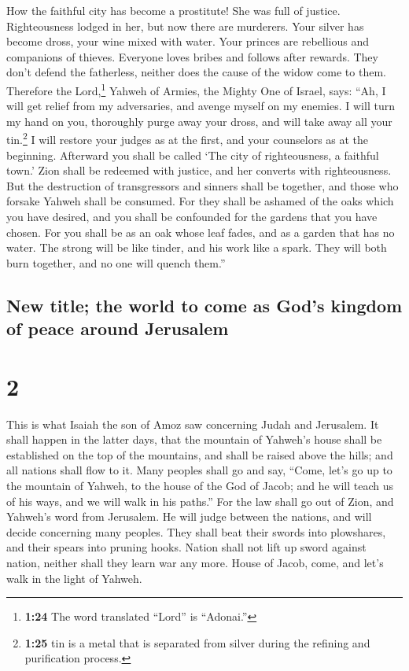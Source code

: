  How the faithful city has become a prostitute! She was
full of justice. Righteousness lodged in her, but now there are
murderers.  Your silver has become dross, your wine mixed
with water.  Your princes are rebellious and companions
of thieves. Everyone loves bribes and follows after rewards. They don't
defend the fatherless, neither does the cause of the widow come to them.
 Therefore the Lord,\footnote{\textbf{1:24} The word
  translated ``Lord'' is ``Adonai.''} Yahweh of Armies, the Mighty One
of Israel, says: ``Ah, I will get relief from my adversaries, and avenge
myself on my enemies.  I will turn my hand on you,
thoroughly purge away your dross, and will take away all your
tin.\footnote{\textbf{1:25} tin is a metal that is separated from silver
  during the refining and purification process.}  I will
restore your judges as at the first, and your counselors as at the
beginning. Afterward you shall be called `The city of righteousness, a
faithful town.'  Zion shall be redeemed with justice, and
her converts with righteousness.  But the destruction of
transgressors and sinners shall be together, and those who forsake
Yahweh shall be consumed.  For they shall be ashamed of
the oaks which you have desired, and you shall be confounded for the
gardens that you have chosen.  For you shall be as an oak
whose leaf fades, and as a garden that has no water.  The
strong will be like tinder, and his work like a spark. They will both
burn together, and no one will quench them.''

\hypertarget{new-title-the-world-to-come-as-gods-kingdom-of-peace-around-jerusalem}{%
\subsection{New title; the world to come as God's kingdom of peace
around
Jerusalem}\label{new-title-the-world-to-come-as-gods-kingdom-of-peace-around-jerusalem}}

\hypertarget{section-1}{%
\section{2}\label{section-1}}

 This is what Isaiah the son of Amoz saw concerning Judah
and Jerusalem.  It shall happen in the latter days, that
the mountain of Yahweh's house shall be established on the top of the
mountains, and shall be raised above the hills; and all nations shall
flow to it.  Many peoples shall go and say, ``Come, let's
go up to the mountain of Yahweh, to the house of the God of Jacob; and
he will teach us of his ways, and we will walk in his paths.'' For the
law shall go out of Zion, and Yahweh's word from Jerusalem.
 He will judge between the nations, and will decide
concerning many peoples. They shall beat their swords into plowshares,
and their spears into pruning hooks. Nation shall not lift up sword
against nation, neither shall they learn war any more. 
House of Jacob, come, and let's walk in the light of Yahweh.

